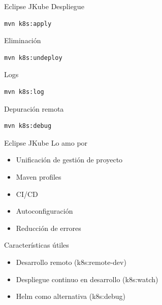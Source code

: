 \documentclass[aspectratio=169]{beamer}
\begin{document}
\begin{frame}[fragile]{Eclipse JKube}
Despliegue
\begin{lstlisting}[language=bash]
mvn k8s:apply
\end{lstlisting}

Eliminación
\begin{lstlisting}[language=bash]
mvn k8s:undeploy
\end{lstlisting}

Logs
\begin{lstlisting}[language=bash]
mvn k8s:log
\end{lstlisting}

Depuración remota
\begin{lstlisting}[language=bash]
mvn k8s:debug
\end{lstlisting}
\end{frame}

\begin{frame}[fragile]{Eclipse JKube}
Lo amo por
\begin{itemize}
\item Unificación de gestión de proyecto
\item Maven profiles
\item CI/CD
\item Autoconfiguración
\item Reducción de errores
\end{itemize}

Características útiles
\begin{itemize}
\item Desarrollo remoto (k8s:remote-dev)
\item Despliegue continuo en desarrollo (k8s:watch)
\item Helm como alternativa (k8s:debug)
\end{itemize}
\end{frame}
\end{document}
